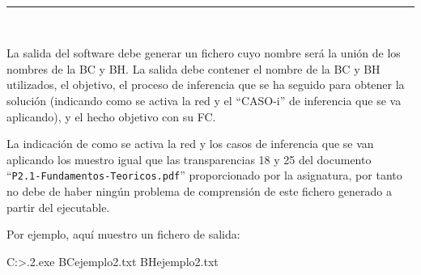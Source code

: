 \begin{center}
	{\fboxrule=4pt } \\
	\setcounter{chapter}{3}
	\setcounter{section}{0}
	\rule{15cm}{0pt} \\
\end{center}
\par La salida del software debe generar  un fichero cuyo 
nombre será la unión de los nombres de la BC y BH. La salida debe contener el nombre de la BC y 
BH  utilizados,  el  objetivo,  el  proceso  de  inferencia  que  se  ha  seguido  para  obtener  la  solución (indicando  como  se  activa  la  red  y  el  ``CASO-i''  de  inferencia  que  se  va  aplicando),  y  el  hecho 
objetivo con su FC. 
\par La indicación de como se activa la red y los casos de inferencia que se van aplicando los muestro igual que las transparencias 18 y 25 del documento 
\\``\texttt{P2.1-Fundamentos-Teoricos.pdf}'' proporcionado por la asignatura, por tanto no debe de haber ningún problema de comprensión de este fichero generado a partir del ejecutable. 
\par Por ejemplo, aquí muestro un fichero de salida:
\begin{listing}[style=consola]
C:\Users\ElenaPerez\SBR\bin\Debug>.\practica2.exe BCejemplo2.txt BHejemplo2.txt
\end{listing}
